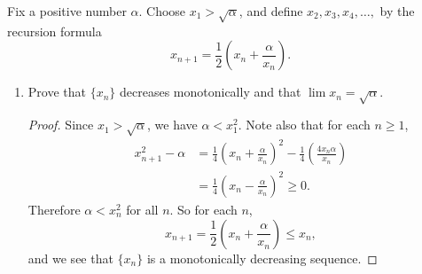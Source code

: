  Fix a positive number $\alpha$. Choose
$x_1 > \sqrt{\alpha}$, and define $x_2, x_3, x_4, \dots,$ by the
recursion formula
\begin{equation*}
  x_{n+1} = \frac12\left(x_n + \frac\alpha{x_n}\right).
\end{equation*}
\begin{enumerate}
\item Prove that $\{x_n\}$ decreases monotonically and that
  $\lim x_n = \sqrt\alpha$.
  \begin{proof}
    Since $x_1 > \sqrt\alpha$, we have $\alpha < x_1^2$. Note also
    that for each $n\geq1$,
    \begin{align*}
      x_{n+1}^2 - \alpha
      &= \frac14\left(x_n + \frac\alpha{x_n}\right)^2
        - \frac14\left(\frac{4x_n\alpha}{x_n}\right) \\
      &= \frac14\left(x_n - \frac\alpha{x_n}\right)^2 \geq 0.
    \end{align*}
    Therefore $\alpha < x_n^2$ for all $n$. So for each $n$,
    \begin{equation*}
      x_{n+1} = \frac12\left(x_n + \frac{\alpha}{x_n}\right)
      \leq x_n,
    \end{equation*}
    and we see that $\{x_n\}$ is a monotonically decreasing sequence.


\end{proof}
\end{enumerate}

